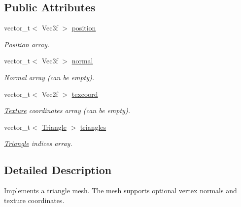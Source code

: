 \subsection*{Public Attributes}
\begin{DoxyCompactItemize}
\item 
vector\_\-t$<$ Vec3f $>$ \hyperlink{classembree_1_1_triangle_mesh_a8a02076acbbf919564dd43a729924fa2}{position}
\begin{DoxyCompactList}\small\item\em Position array. \item\end{DoxyCompactList}\item 
vector\_\-t$<$ Vec3f $>$ \hyperlink{classembree_1_1_triangle_mesh_af313e5aa4a8898c5cf34c3383ad0f1a2}{normal}
\begin{DoxyCompactList}\small\item\em Normal array (can be empty). \item\end{DoxyCompactList}\item 
vector\_\-t$<$ Vec2f $>$ \hyperlink{classembree_1_1_triangle_mesh_a3d26d3b80193bfb3382ac34c217f1b2d}{texcoord}
\begin{DoxyCompactList}\small\item\em \hyperlink{classembree_1_1_texture}{Texture} coordinates array (can be empty). \item\end{DoxyCompactList}\item 
vector\_\-t$<$ \hyperlink{structembree_1_1_triangle_mesh_1_1_triangle}{Triangle} $>$ \hyperlink{classembree_1_1_triangle_mesh_a0687f3b2a9800ef845be1770c94f76f8}{triangles}
\begin{DoxyCompactList}\small\item\em \hyperlink{structembree_1_1_triangle_mesh_1_1_triangle}{Triangle} indices array. \item\end{DoxyCompactList}\end{DoxyCompactItemize}


\subsection{Detailed Description}
Implements a triangle mesh. The mesh supports optional vertex normals and texture coordinates. 

